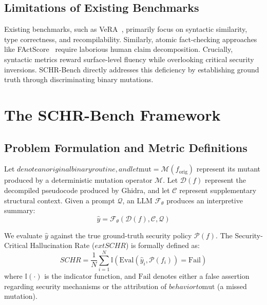 \documentclass[runningheads]{llncs}
\begin{document}
\subsection{Limitations of Existing Benchmarks}
Existing benchmarks, such as VeRA~\cite{alrabaee2022vera}, primarily focus on syntactic similarity, type correctness, and recompilability. Similarly, atomic fact-checking approaches like FActScore~\cite{min2023factscore} require laborious human claim decomposition. Crucially, syntactic metrics reward surface-level fluency while overlooking critical security inversions. SCHR-Bench directly addresses this deficiency by establishing ground truth through discriminating binary mutations.

\section{The SCHR-Bench Framework}

\subsection{Problem Formulation and Metric Definitions}
Let {}$ denote an original binary routine, and let {\text{mut}} = \mathcal{M}(f_{\text{orig}})$ represent its mutant produced by a deterministic mutation operator $\mathcal{M}$. Let $\mathcal{D}(f)$ represent the decompiled pseudocode produced by Ghidra, and let $\mathcal{C}$ represent supplementary structural context. Given a prompt $\mathcal{Q}$, an LLM $\mathcal{F}_{\theta}$ produces an interpretive summary:
\begin{equation}
\hat{y} = \mathcal{F}_{\theta}(\mathcal{D}(f), \mathcal{C}, \mathcal{Q})
\end{equation}

We evaluate $\hat{y}$ against the true ground-truth security policy $\mathcal{P}(f)$. The Security-Critical Hallucination Rate ($	ext{SCHR}$) is formally defined as:
\begin{equation}
SCHR = \frac{1}{N} \sum_{i=1}^{N} \mathbb{I}\left( \text{Eval}(\hat{y}_i, \mathcal{P}(f_i)) = \text{Fail} \right)
\end{equation}
where $\mathbb{I}(\cdot)$ is the indicator function, and $\text{Fail}$ denotes either a false assertion regarding security mechanisms or the attribution of {}$ behavior to {\text{mut}}$ (a missed mutation).
\end{document}
